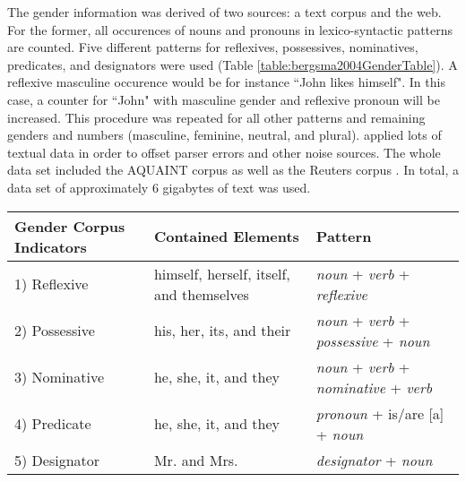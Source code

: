 The gender information was derived of two sources: a text corpus and the web. 
For the former, all occurences of nouns and pronouns in lexico-syntactic patterns are counted. Five different patterns for reflexives, possessives, nominatives, predicates, and designators were used (Table \ref{table:bergsma2004GenderTable}). A reflexive masculine occurence would be for instance “John likes himself". In this case, a counter for “John" with masculine gender and reflexive pronoun will be increased. This procedure was repeated for all other patterns and remaining genders and numbers (masculine, feminine, neutral, and plural). \cite{bergsma2005automatic} applied lots of textual data in order to offset parser errors and other noise sources. The whole data set included the AQUAINT corpus \citep{graff2002aquaint} as well as the Reuters corpus \citep{rose2002reuters}. In total, a data set of approximately 6 gigabytes of text was used.

\begin{center}
    \begin{tabular}{| l | p{5cm} | p{5cm} |}
    \hline
    Gender Corpus Indicators & Contained Elements & Pattern \\ \hline
\hline
    1) Reflexive & himself, herself, itself, and themselves &  \textit{noun} + \textit{verb} + \textit{reflexive}\\ \hline
    2) Possessive & his, her, its, and their & \textit{noun} + \textit{verb} + \textit{possessive} + \textit{noun} \\ \hline
    3) Nominative & he, she, it, and they & \textit{noun} + \textit{verb} + \textit{nominative} +  \textit{verb} \\ \hline
    4) Predicate & he, she, it, and they & \textit{pronoun} + is/are [a] + \textit{noun}  \\ \hline
    5) Designator & Mr. and Mrs. & \textit{designator} + \textit{noun}\\ \hline
    \end{tabular}
     \label{table:bergsma2004GenderTable}
\end{center}

